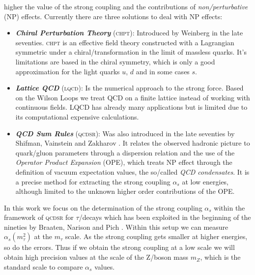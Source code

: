 \documentclass[../../index.tex]{subfiles}
\begin{document}
higher the value of the strong coupling and the contributions of
\textit{non\-/perturbative} (NP) effects. Currently there are three solutions to
deal with NP effects:
\begin{itemize}
\item \textbf{\textit{Chiral Perturbation Theory}} (\textsc{chpt}): Introduced
  by Weinberg \cite{Weinberg1978} in the late seventies. \textsc{chpt} is an
  effective field theory constructed with a Lagrangian symmetric under a
  chiral\-/transformation in the limit of massless quarks. It's limitations are
  based in the chiral symmetry, which is only a good approximation for the light
  quarks $u$, $d$ and in some cases $s$.
\item \textbf{\textit{Lattice QCD}} (\textsc{lqcd}): Is the numerical approach
  to the strong force. Based on the Wilson Loops \cite{Wilson1974} we treat QCD
  on a finite lattice instead of working with continuous fields. LQCD has
  already many applications but is limited due to its computational expensive
  calculations.
\item \textbf{\textit{QCD Sum Rules}} (\textsc{qcdsr}): Was also introduced in
  the late seventies by Shifman, Vainstein and Zakharov
  \cite{Shifman1978,Shifman1978a}. It relates the observed hadronic picture to
  quark\-/gluon parameters through a dispersion relation and the use of the
  \textit{Operator Product Expansion} (OPE), which treats NP effect through the
  definition of vacuum expectation values, the so\-/called \textit{QCD
    condensates}. It is a precise method for extracting the strong coupling
  $\alpha_s$ at low energies, although limited to the unknown higher order
  contributions of the OPE.
\end{itemize}


In this work we focus on the determination of the strong coupling $\alpha_s$
within the framework of \textsc{qcdsr} for $\tau$\-/decays which has been
exploited in the beginning of the nineties by Braaten, Narison and Pich
\cite{Braaten1991}. Within this setup we can measure $\alpha_s(m_\tau^2)$ at the
$m_\tau$ scale. As the strong coupling gets smaller at higher energies, so do
the errors. Thus if we obtain the strong coupling at a low scale we will obtain
high precision values at the scale of the Z\-/boson mass $m_Z$, which is the
standard scale to compare $\alpha_s$ values.
\end{document}
